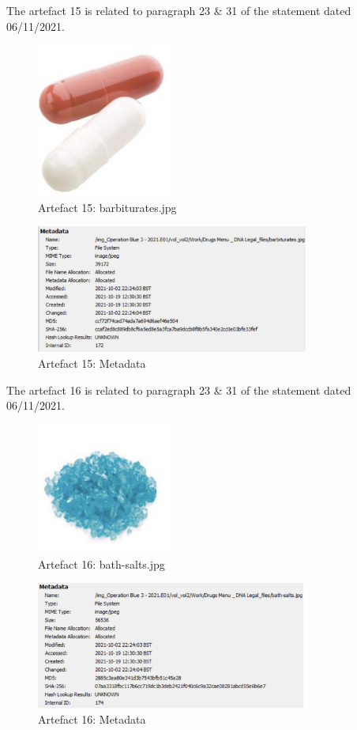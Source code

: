 The artefact 15 is related to paragraph 23 \& 31 of the statement dated
06/11/2021.
\begin{figure}[H]
  \centering
  \includegraphics[width=0.4\textwidth]{figures/artefact15}
  \caption{Artefact 15: barbiturates.jpg}
  \label{f:artefact15}
\end{figure}
\begin{figure}[H]
  \centering
  \includegraphics[width=0.8\textwidth]{figures/meta15}
  \caption{Artefact 15: Metadata}
  \label{f:meta15}
\end{figure}
The artefact 16 is related to paragraph 23 \& 31 of the statement dated
06/11/2021.
\begin{figure}[H]
  \centering
  \includegraphics[width=0.4\textwidth]{figures/artefact16}
  \caption{Artefact 16: bath-salts.jpg}
  \label{f:artefact16}
\end{figure}
\begin{figure}[H]
  \centering
  \includegraphics[width=0.8\textwidth]{figures/meta16}
  \caption{Artefact 16: Metadata}
  \label{f:meta16}
\end{figure}
